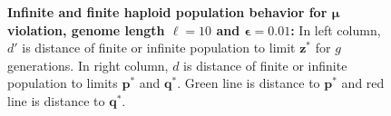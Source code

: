 \begin{figure}[h]
\begin{center}
\hspace{-3em}%
\vspace{-0.5em} \hspace{-3em}%
\caption[\textbf{Infinite and finite haploid population behavior for $\bm{\mu}$ violation, genome length $\ell = 10$ and $\bm{\epsilon} = 0.01$}]{\textbf{Infinite and finite haploid population behavior for $\bm{\mu}$ violation, genome length $\ell = 10$ and $\bm{\epsilon} = 0.01$:} 
  In left column, $d'$ is distance of finite or infinite population to limit $\bm{z}^\ast$ for $g$ generations. In right column, $d$ is distance of finite or infinite population to limits $\bm{p}^\ast$ and $\bm{q}^\ast$. Green line is distance to $\bm{p}^\ast$ and red line is distance to $\bm{q}^\ast$.}
\label{oscillation_10h_vio_mu_0.01}
\end{center}
\end{figure}

